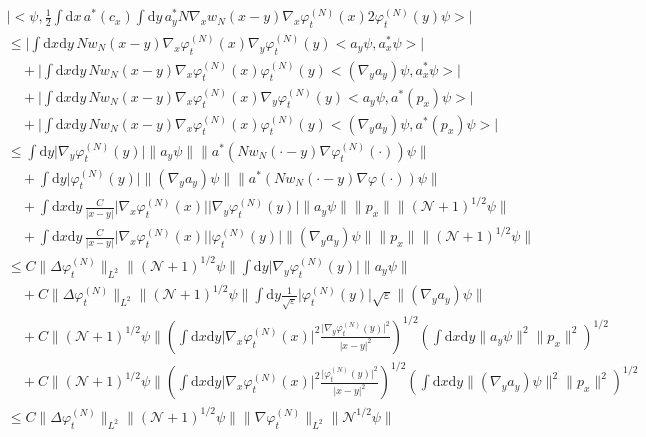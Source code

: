 \documentclass[11pt,a4paper,draft,DIV11]{scrartcl}	%
\newcommand{\di}{\textrm{d}}		%
\newcommand{\Ncal}{\mathcal{N}}		%
\newcommand{\scal}[2]{\big<#1,#2\big>} %
\newcommand{\norm}[1]{\lVert#1\rVert}	%
\newcommand{\ph}{\varphi_t^{(N)}}	%
\begin{document}
\begin{align*}
& \lvert \scal{\psi}{\frac{1}{2}\int \di x\,a^\ast(c_x) \int \di y\,a^\ast_y N\nabla_x w_N(x-y)\nabla_x \ph(x) 2\ph(y) \psi}\rvert \\
& \leq \lvert \int \di x \di y\, Nw_N(x-y) \nabla_x \ph(x)  \nabla_y \ph(y) \scal{a_y\psi}{a^\ast_x\psi} \rvert \\
& \quad + \lvert \int \di x \di y\,  Nw_N(x-y) \nabla_x \ph(x) \ph(y)  \scal{(\nabla_y a_y)\psi}{a^\ast_x \psi} \rvert \\
& \quad + \lvert \int \di x \di y\, Nw_N(x-y) \nabla_x  \ph(x) \nabla_y \ph(y) \scal{a_y \psi}{a^\ast(p_x)\psi} \rvert \\
& \quad + \lvert \int \di x \di y\, Nw_N(x-y) \nabla_x \ph(x) \ph(y) \scal{(\nabla_y a_y)\psi}{a^\ast(p_x)\psi} \rvert \\
&\leq \int \di y \lvert \nabla_y \ph(y)\rvert \norm{a_y \psi} \norm{a^\ast(Nw_N(\cdot -y)\nabla\ph(\cdot))\psi} \\
& \quad + \int \di y \lvert \ph(y)\rvert \norm{(\nabla_y a_y)\psi} \norm{a^\ast(Nw_N(\cdot-y)\nabla\varphi(\cdot))\psi} \\
& \quad + \int \di x\di y\, \frac{C}{\lvert x-y\rvert} \lvert \nabla_x\ph(x)\rvert \lvert \nabla_y \ph(y)\rvert \norm{a_y \psi} \norm{p_x} \norm{(\Ncal+1)^{1/2}\psi} \\
& \quad + \int \di x\di y\, \frac{C}{\lvert x-y\rvert} \lvert \nabla_x\ph(x)\rvert \lvert \ph(y)\rvert \norm{(\nabla_y a_y)\psi} \norm{p_x} \norm{(\Ncal+1)^{1/2}\psi} \\
&\leq C \norm{\Delta\ph}_{L^2} \norm{(\Ncal+1)^{1/2}\psi} \int \di y \lvert \nabla_y \ph(y) \rvert \norm{a_y \psi} \\
& \quad + C \norm{\Delta \ph}_{L^2} \norm{(\Ncal+1)^{1/2}\psi} \int \di y \frac{1}{\sqrt{\varepsilon}} \lvert \ph(y)\rvert \sqrt{\varepsilon} \norm{(\nabla_y a_y)\psi} \\
& \quad + C \norm{(\Ncal+1)^{1/2}\psi} \left(\int \di x\di y \lvert \nabla_x\ph(x)\rvert^2 \frac{\lvert\nabla_y \ph(y)\rvert^2}{\lvert x-y \rvert^2} \right)^{1/2} \left(\int \di x\di y \norm{a_y \psi}^2 \norm{p_x}^2 \right)^{1/2} \\
& \quad + C \norm{(\Ncal+1)^{1/2}\psi} \left(\int \di x\di y \lvert \nabla_x\ph(x)\rvert^2 \frac{\lvert \ph(y)\rvert^2}{\lvert x-y\rvert^2} \right)^{1/2} \left(\int \di x\di y \norm{(\nabla_y a_y)\psi}^2 \norm{p_x}^2 \right)^{1/2} \\
& \leq C \norm{\Delta \ph}_{L^2} \norm{(\Ncal+1)^{1/2}\psi} \norm{\nabla \ph}_{L^2} \norm{\Ncal^{1/2}\psi} \\

\end{align*}
\end{document}
